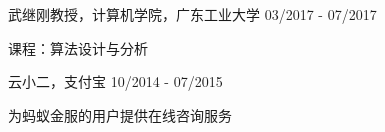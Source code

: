 \vspace{-2.0mm}

\begin{cventries}

\cvexperience
{ 武继刚教授，计算机学院，广东工业大学}
{03/2017 - 07/2017}
{
    \begin{cvitems}
    \item {课程：算法设计与分析}
    \end{cvitems}
}

\cvexperience
{ 云小二，支付宝}
{10/2014 - 07/2015}
{
    \begin{cvitems}
    \item {为蚂蚁金服的用户提供在线咨询服务}
    \end{cvitems}
}

\end{cventries}